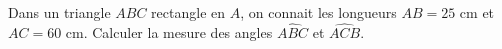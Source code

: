 
Dans un triangle $ABC$ rectangle en $A$, on connait les longueurs $AB=25$ cm et $AC=60$ cm. Calculer la mesure des angles $\widehat{ABC}$ et $\widehat{ACB}$.